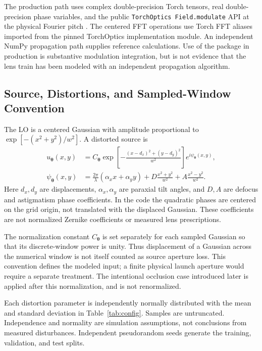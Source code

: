\documentclass[journal]{IEEEtran}
\begin{document}
The production path uses complex double-precision Torch tensors, real double-precision phase variables, and the public \texttt{TorchOptics Field.modulate} API at the physical Fourier pitch \cite{torchoptics}. The centered FFT operations use Torch FFT aliases imported from the pinned TorchOptics implementation module. An independent NumPy propagation path supplies reference calculations. Use of the package in production is substantive modulation integration, but is not evidence that the lens train has been modeled with an independent propagation algorithm.

\subsection{Source, Distortions, and Sampled-Window Convention}
The LO is a centered Gaussian with amplitude proportional to $\exp[-(x^2+y^2)/w^2]$. A distorted source is
\begin{align}
 u_{\boldsymbol\theta}(x,y)&=C_{\boldsymbol\theta}
 \exp\!\left[-\frac{(x-d_x)^2+(y-d_y)^2}{w^2}\right]
 e^{i\psi_{\boldsymbol\theta}(x,y)}, \label{eq:source}\\
 \psi_{\boldsymbol\theta}(x,y)&=\frac{2\pi}{\lambda}(\alpha_xx+\alpha_yy)
 +D\frac{x^2+y^2}{w^2}+A\frac{x^2-y^2}{w^2}.
 \label{eq:distortion}
\end{align}
Here $d_x,d_y$ are displacements, $\alpha_x,\alpha_y$ are paraxial tilt angles, and $D,A$ are defocus and astigmatism phase coefficients. In the code the quadratic phases are centered on the grid origin, not translated with the displaced Gaussian. These coefficients are not normalized Zernike coefficients or measured lens prescriptions.

The normalization constant $C_{\boldsymbol\theta}$ is set separately for each sampled Gaussian so that its discrete-window power is unity. Thus displacement of a Gaussian across the numerical window is not itself counted as source aperture loss. This convention defines the modeled input; a finite physical launch aperture would require a separate treatment. The intentional occlusion case introduced later is applied after this normalization, and is not renormalized.

Each distortion parameter is independently normally distributed with the mean and standard deviation in Table~\ref{tab:config}. Samples are untruncated. Independence and normality are simulation assumptions, not conclusions from measured disturbances. Independent pseudorandom seeds generate the training, validation, and test splits.
\end{document}
